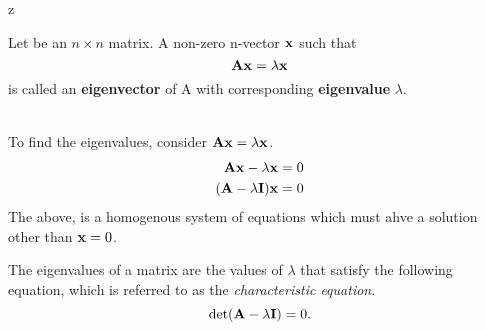 z%


\begin{definition}
  Let  be an $n \times n$ matrix. A non-zero n-vector $\mathbf{x}$ such that $$\mathbf{A} \mathbf{x} = \lambda \mathbf{x}$$ is called an \textbf{eigenvector} of \matri A with corresponding \textbf{eigenvalue} $\lambda$.
\end{definition}~\\
To find the eigenvalues, consider $\mathbf{Ax} = \lambda \mathbf{x}$.
\begin{align*}
  \mathbf{Ax} - \lambda\mathbf{x} &= 0\\
  (\mathbf{A} - \lambda\mathbf{I})\mathbf{x} &= 0
\end{align*}
The above, is a homogenous system of equations which must ahve a solution other than $\mathbf{x} = 0$. 

The eigenvalues of a matrix  are the values of $\lambda$ that satisfy the following equation, which is referred to as the \emph{characteristic equation}. 
\[\det(\mathbf{A} - \lambda\mathbf{I}) = 0.\]



